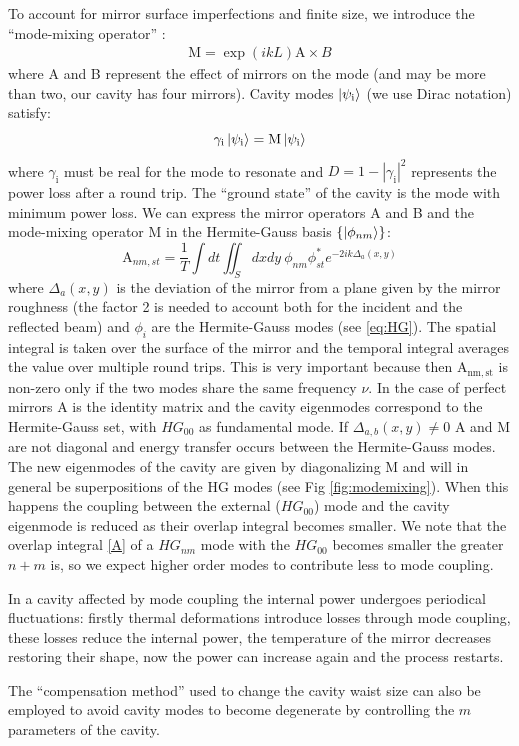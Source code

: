 To account for mirror surface imperfections and finite size, we introduce the ``mode-mixing operator'' \parencite{Kleckner2010}:
\begin{align}
\mathrm{M}=\exp(ikL)\mathrm{A}\times{B}
\end{align}
where A and B represent the effect of mirrors on the mode (and may be more than two,
our cavity has four mirrors).
Cavity modes $\ket{\psi_\mathrm{i}}$ (we use Dirac notation) satisfy:
\begin{equation}
\gamma_\mathrm{i}\ket{\psi_\mathrm{i}} = \mathrm{M}\ket{\psi_\mathrm{i}}
\end{equation}
where $\gamma_\mathrm{i}$ must be real for the mode to resonate and $D=1-|\gamma_\mathrm{i}|^2$ represents the power loss after a round trip. The ``ground state'' of the cavity is the mode with minimum power loss.
We can express the mirror operators A and B and the mode-mixing operator M in the Hermite-Gauss basis $\{\ket{\phi_{nm}}\}$:
\begin{equation}
\label{A}
\mathrm{A}_{nm,st} = \frac{1}{T}\int dt\iint_S dxdy\ \phi_{nm}\phi_{st}^*e^{-2ik\Delta_a(x,y)}
\end{equation}
where $\Delta_a(x,y)$ is the deviation of the mirror from a plane given by the mirror roughness (the factor 2 is needed to account both for the incident and the reflected beam) and $\phi_i$ are the Hermite-Gauss modes (see \ref{eq:HG}). The spatial integral is taken over the surface of the mirror and the temporal integral averages the value over multiple round trips. This is very important because then $\mathrm{A_{nm,st}}$ is non-zero only if the two modes share the same frequency $\nu$. In the case of perfect mirrors A is the identity matrix and the cavity eigenmodes correspond to the Hermite-Gauss set, with $HG_{00}$ as fundamental mode. If $\Delta_{a,b}(x,y) \ne 0$ A and M are not diagonal and energy transfer occurs between the Hermite-Gauss modes. The new eigenmodes of the cavity are given by diagonalizing M and will in general be superpositions of the HG modes (see Fig \ref{fig:modemixing}). When this happens the coupling between the external ($HG_{00}$) mode and the cavity eigenmode is reduced as their overlap integral becomes smaller.  We note that the overlap integral \ref{A} of a $HG_{nm}$ mode with the $HG_{00}$ becomes smaller the greater $n+m$ is, so we expect higher order modes to contribute less to mode coupling.

In a cavity affected by mode coupling the internal power undergoes periodical fluctuations: firstly thermal deformations introduce losses through mode coupling, these losses reduce the internal power, the temperature of the mirror decreases restoring their shape, now the power can increase again and the process restarts.

The ``compensation method'' used to change the cavity waist size can also be employed to avoid cavity modes to become degenerate by controlling the $m$ parameters of the cavity.